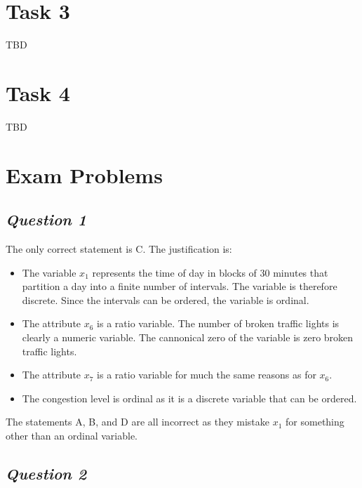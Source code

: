 \documentclass[twoside,11pt]{article}
\makeatletter
\let\@oldsection\section
\renewcommand\section[1]{\@oldsection*{#1}}
\let\@oldsubsection\subsection
\renewcommand\subsection[1]{\@oldsubsection*{\textit{#1}}}
\makeatother
\begin{document}
\section{Task 3}


TBD


\section{Task 4}

TBD

\section{Exam Problems}

\subsection{Question 1}

The only correct statement is C. The justification is:

\begin{itemize}
\item
  The variable \(x_1\) represents the time of day in blocks of 30
  minutes that partition a day into a finite number of intervals. The
  variable is therefore discrete. Since the intervals can be ordered,
  the variable is ordinal.
\item
  The attribute \(x_6\) is a ratio variable. The number of broken
  traffic lights is clearly a numeric variable. The cannonical zero of
  the variable is zero broken traffic lights.
\item
  The attribute \(x_7\) is a ratio variable for much the same reasons as
  for \(x_6\).
\item
  The congestion level is ordinal as it is a discrete variable that can
  be ordered.
\end{itemize}

The statements A, B, and D are all incorrect as they mistake \(x_1\) for something other than an ordinal variable.

\subsection{Question 2}
\end{document}
